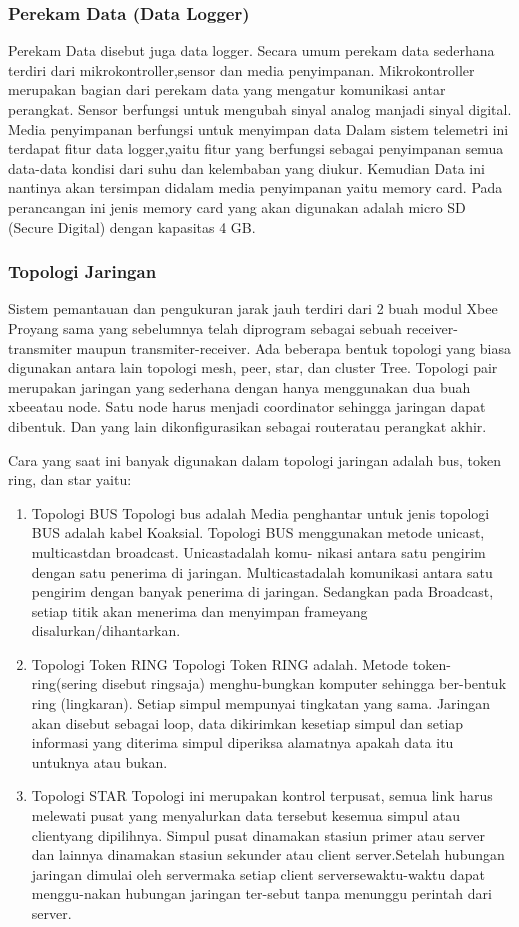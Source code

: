\subsubsection{Perekam Data (Data Logger)}
Perekam Data disebut juga data logger. Secara umum perekam data sederhana terdiri dari mikrokontroller,sensor dan media penyimpanan.
Mikrokontroller merupakan bagian dari perekam data yang mengatur komunikasi antar perangkat. Sensor berfungsi untuk mengubah sinyal analog manjadi sinyal digital. Media penyimpanan berfungsi untuk menyimpan data Dalam sistem telemetri ini terdapat fitur data logger,yaitu fitur yang berfungsi sebagai penyimpanan semua data-data kondisi dari suhu dan kelembaban yang diukur. Kemudian Data ini nantinya akan
tersimpan didalam media penyimpanan yaitu memory card. Pada perancangan ini jenis memory card yang akan digunakan adalah micro SD 
(Secure Digital) dengan kapasitas 4 GB.

\subsubsection{Topologi Jaringan}
Sistem pemantauan dan pengukuran jarak jauh terdiri dari 2 buah modul 
Xbee Proyang sama yang sebelumnya telah diprogram sebagai sebuah receiver-transmiter maupun transmiter-receiver. Ada beberapa bentuk topologi yang biasa digunakan antara lain topologi mesh, peer, star, dan cluster Tree.
Topologi pair merupakan jaringan yang sederhana dengan hanya menggunakan dua buah xbeeatau node. Satu node harus menjadi coordinator sehingga jaringan dapat dibentuk. Dan yang lain dikonfigurasikan sebagai routeratau perangkat akhir.

Cara yang saat ini banyak digunakan  dalam topologi jaringan adalah bus, token ring, dan star yaitu:
\begin{enumerate}
\item Topologi BUS 
Topologi bus adalah Media penghantar untuk jenis topologi BUS adalah kabel Koaksial. Topologi BUS menggunakan metode unicast, multicastdan broadcast. Unicastadalah komu- nikasi antara satu pengirim 
dengan satu penerima di jaringan. Multicastadalah komunikasi antara satu pengirim dengan banyak penerima di jaringan. Sedangkan pada Broadcast, setiap titik akan menerima dan menyimpan frameyang disalurkan/dihantarkan.

\item Topologi Token RING 
Topologi Token RING adalah. Metode token-ring(sering disebut ringsaja) menghu-bungkan komputer sehingga ber-bentuk ring (lingkaran). Setiap 
simpul mempunyai tingkatan yang sama. Jaringan akan disebut sebagai loop, data dikirimkan kesetiap simpul dan setiap informasi yang diterima simpul diperiksa alamatnya apakah data itu untuknya atau bukan.

\item Topologi STAR 
Topologi ini merupakan kontrol terpusat, semua link harus melewati pusat yang menyalurkan data tersebut kesemua simpul atau clientyang dipilihnya. Simpul pusat dinamakan stasiun primer atau 
server dan lainnya dinamakan 
stasiun sekunder atau client server.Setelah hubungan jaringan dimulai oleh servermaka setiap client serversewaktu-waktu dapat menggu-nakan hubungan jaringan ter-sebut tanpa menunggu perintah dari server.
\end{enumerate}
